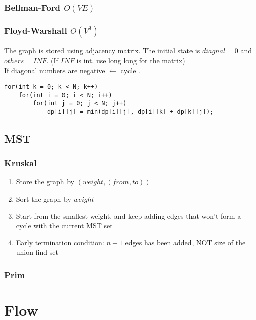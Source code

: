 \documentclass[10pt,oneside]{article}
\begin{document}
\begin{landscape}
\begin{multicols}{2}
\subsubsection{Bellman-Ford $O(VE)$}


\subsubsection{Floyd-Warshall $O(V^3)$}

The graph is stored using adjacency matrix. The initial state is $diagnal = 0$ and $others = INF$. (If $INF$ is int, use long long for the matrix)\\
If diagonal numbers are negative $\leftarrow$ cycle . \\

\begin{lstlisting}
for(int k = 0; k < N; k++)
	for(int i = 0; i < N; i++)
		for(int j = 0; j < N; j++)
			dp[i][j] = min(dp[i][j], dp[i][k] + dp[k][j]);
\end{lstlisting}

\subsection{MST}

\subsubsection{Kruskal}

\begin{enumerate}
	\item Store the graph by $(weight, (from , to))$
	\item Sort the graph by $weight$ 
	\item Start from the smallest weight, and keep adding edges that won't form a cycle with the current MST set
	\item Early termination condition: $n - 1$ edges has been added, NOT size of the union-find set
\end{enumerate}

\subsubsection{Prim}


\section{Flow}


\end{multicols}
\end{landscape}
\end{document}
